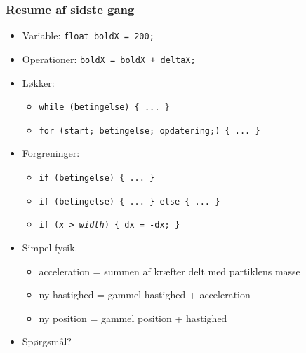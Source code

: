 \documentclass{beamer}
\begin{document}
\begin{frame}[fragile]
  \frametitle{Resume af sidste gang}
  
  \begin{itemize}
  \item Variable: \texttt{float boldX = 200;}\\
  \item Operationer: \texttt{boldX = boldX + deltaX;}\\
  \item Løkker:
    \begin{itemize}
    \item \texttt{while (betingelse) \{ ... \}}\\
    \item \texttt{for (start; betingelse; opdatering;) \{ ... \}}\\
    \end{itemize}
  \item Forgreninger: 
    \begin{itemize}
    \item \texttt{if (betingelse) \{ ... \}}\\
    \item \texttt{if (betingelse) \{ ... \} else \{ ... \}}\\
    \item \texttt{if (\emph{x > width}) \{ dx = -dx; \}}\\
    \end{itemize}
  \item Simpel fysik.
    \begin{itemize}
    \item acceleration = summen af kræfter delt med partiklens masse
    \item ny hastighed = gammel hastighed + acceleration
    \item ny position = gammel position + hastighed
    \end{itemize}
  \item Spørgsmål?
  \end{itemize}  
\end{frame}
\end{document}
